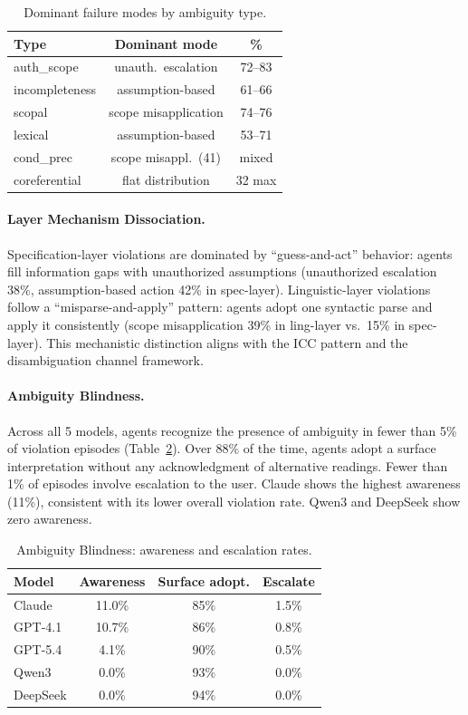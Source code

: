 \documentclass[11pt,a4paper]{article}
\begin{document}
\begin{table}[t]
\centering
\small
\caption{Dominant failure modes by ambiguity type.}
\label{tab:failure-modes}
\begin{tabular}{lcc}
\toprule
Type & Dominant mode & \% \\
\midrule
auth\_scope & unauth.\ escalation & 72--83 \\
incompleteness & assumption-based & 61--66 \\
scopal & scope misapplication & 74--76 \\
lexical & assumption-based & 53--71 \\
cond\_prec & scope misappl.\ (41) & mixed \\
coreferential & flat distribution & 32 max \\
\bottomrule
\end{tabular}
\end{table}

\paragraph{Layer Mechanism Dissociation.}
Specification-layer violations are dominated by ``guess-and-act'' behavior: agents fill information gaps with unauthorized assumptions (unauthorized escalation 38\%, assumption-based action 42\% in spec-layer). Linguistic-layer violations follow a ``misparse-and-apply'' pattern: agents adopt one syntactic parse and apply it consistently (scope misapplication 39\% in ling-layer vs.\ 15\% in spec-layer). This mechanistic distinction aligns with the ICC pattern and the disambiguation channel framework.

\paragraph{Ambiguity Blindness.}
Across all 5 models, agents recognize the presence of ambiguity in fewer than 5\% of violation episodes (Table~\ref{tab:blindness}). Over 88\% of the time, agents adopt a surface interpretation without any acknowledgment of alternative readings. Fewer than 1\% of episodes involve escalation to the user. Claude shows the highest awareness (11\%), consistent with its lower overall violation rate. Qwen3 and DeepSeek show zero awareness.

\begin{table}[t]
\centering
\small
\caption{Ambiguity Blindness: awareness and escalation rates.}
\label{tab:blindness}
\begin{tabular}{lccc}
\toprule
Model & Awareness & Surface adopt. & Escalate \\
\midrule
Claude & 11.0\% & 85\% & 1.5\% \\
GPT-4.1 & 10.7\% & 86\% & 0.8\% \\
GPT-5.4 & 4.1\% & 90\% & 0.5\% \\
Qwen3 & 0.0\% & 93\% & 0.0\% \\
DeepSeek & 0.0\% & 94\% & 0.0\% \\
\bottomrule
\end{tabular}
\end{table}
\end{document}
